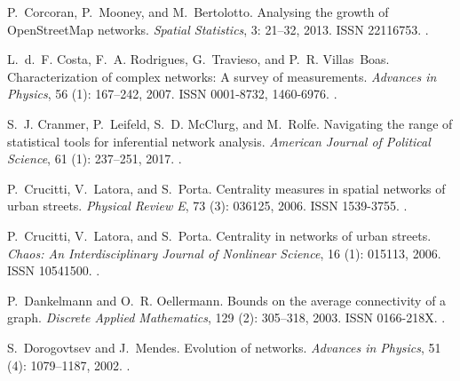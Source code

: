\documentclass[Afour,sageh,times]{sagej}
\begin{document}
\begin{thebibliography}{54}
	P.~Corcoran, P.~Mooney, and M.~Bertolotto.
	\newblock Analysing the growth of {OpenStreetMap} networks.
	\newblock \emph{Spatial Statistics}, 3: 21--32, 2013.
	\newblock ISSN 22116753.
	\newblock {}.
	
	L.~d.~F. Costa, F.~A. Rodrigues, G.~Travieso, and P.~R. Villas~Boas.
	\newblock Characterization of complex networks: {A} survey of measurements.
	\newblock \emph{Advances in Physics}, 56 (1): 167--242, 2007.
	\newblock ISSN 0001-8732, 1460-6976.
	\newblock {}.
	
	S.~J. Cranmer, P.~Leifeld, S.~D. McClurg, and M.~Rolfe.
	\newblock Navigating the range of statistical tools for inferential network
	analysis.
	\newblock \emph{American Journal of Political Science}, 61
	(1): 237--251, 2017.
	\newblock {}.
	
	P.~Crucitti, V.~Latora, and S.~Porta.
	\newblock Centrality measures in spatial networks of urban streets.
	\newblock \emph{Physical Review E}, 73 (3): 036125,
	2006{}.
	\newblock ISSN 1539-3755.
	\newblock {}.
	
	P.~Crucitti, V.~Latora, and S.~Porta.
	\newblock Centrality in networks of urban streets.
	\newblock \emph{Chaos: An Interdisciplinary Journal of Nonlinear Science},
	16 (1): 015113, 2006{}.
	\newblock ISSN 10541500.
	\newblock {}.
	
	P.~Dankelmann and O.~R. Oellermann.
	\newblock Bounds on the average connectivity of a graph.
	\newblock \emph{Discrete Applied Mathematics}, 129 (2):
	305--318, 2003.
	\newblock ISSN 0166-218X.
	\newblock {}.
	
	S.~Dorogovtsev and J.~Mendes.
	\newblock Evolution of networks.
	\newblock \emph{Advances in Physics}, 51 (4): 1079--1187,
	2002.
	\newblock {}.
	

\end{thebibliography}
\end{document}
